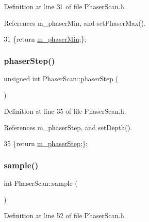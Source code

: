 Definition at line 31 of file Phaser\+Scan.\+h.



References m\+\_\+phaser\+Min, and set\+Phaser\+Max().


\begin{DoxyCode}
31 \{\textcolor{keywordflow}{return} \hyperlink{classPhaserScan_a65f83dd6b9e6c62cd828ef7b094c0361}{m\_phaserMin};\};
\end{DoxyCode}
\mbox{\label{classPhaserScan_a8bebde600274e342a78783e49917b64d}} 
\subsubsection{\texorpdfstring{phaser\+Step()}{phaserStep()}}
{\footnotesize\ttfamily unsigned int Phaser\+Scan\+::phaser\+Step (\begin{DoxyParamCaption}{ }\end{DoxyParamCaption})\hspace{0.3cm}{\ttfamily [inline]}}



Definition at line 35 of file Phaser\+Scan.\+h.



References m\+\_\+phaser\+Step, and set\+Depth().


\begin{DoxyCode}
35 \{\textcolor{keywordflow}{return} \hyperlink{classPhaserScan_aed5bcb2582744f73a6189544c272213b}{m\_phaserStep};\};
\end{DoxyCode}
\mbox{\label{classPhaserScan_a278292fe5bc31814dab8cd54deb76b48}} 
\subsubsection{\texorpdfstring{sample()}{sample()}}
{\footnotesize\ttfamily int Phaser\+Scan\+::sample (\begin{DoxyParamCaption}{ }\end{DoxyParamCaption})\hspace{0.3cm}{\ttfamily [inline]}}



Definition at line 52 of file Phaser\+Scan.\+h.



